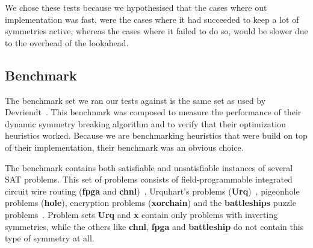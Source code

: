 	We chose these tests because we hypothesised that the cases where out implementation was fast,
	were the cases where it had succeeded to keep a lot of symmetries active,
	whereas the cases where it failed to do so, would be slower due to the overhead of the lookahead.

\subsection{Benchmark}
\label{ssec:benchmark}
	The benchmark set we ran our tests against is the same set as used by Devriendt~\cite{devriendt2012symmetry}.
	This benchmark was composed to measure the performance of their dynamic symmetry
	breaking algorithm and to verify that their optimization heuristics worked.
	Because we are benchmarking heuristics that were build on top of their implementation, their
	benchmark was an obvious choice.

	The benchmark contains both satisfiable and unsatisfiable instances of several SAT problems.
	This set of problems consists of field-programmable integrated circuit wire routing (\textbf{fpga} and
	\textbf{chnl})~\cite{nam2004comparative}, Urquhart's problems (\textbf{Urq})~\cite{urquhart1987hard},
	pigeonhole problems (\textbf{hole}), encryption problems (\textbf{xorchain}) and the \textbf{battleships}
	puzzle problems~\cite{sevenster2004battleships}.
	Problem sets \textbf{Urq} and \textbf{x} contain only problems with inverting symmetries, while the
	others like \textbf{chnl}, \textbf{fpga} and \textbf{battleship} do not contain this type of symmetry
	at all\cite{devriendt2012symmetry}.
